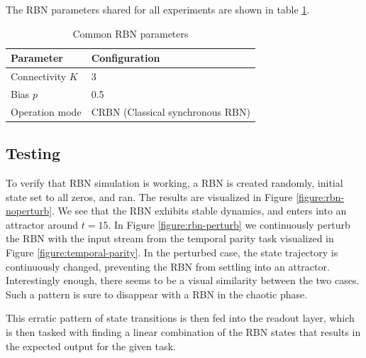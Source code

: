 The RBN parameters shared for all experiments are shown in table
\ref{table:shared-rbn-parameters}.

\begin{table}[h]
    \centering
    \caption{Common RBN parameters}
    \label{table:shared-rbn-parameters}
    \begin{tabular}{ll}
        \hline
        \textbf{Parameter} & \textbf{Configuration} \\
        \hline
        \hline
        Connectivity $K$ & 3   \\
        Bias $p$         & 0.5 \\
        Operation mode & CRBN (Classical synchronous RBN) \\
        \hline
    \end{tabular}
\end{table}

\subsection{Testing}

To verify that RBN simulation is working,
a RBN is created randomly, initial state set to all zeros, and ran.
The results are visualized in Figure \ref{figure:rbn-noperturb}.
We see that the RBN exhibits stable dynamics, and enters into an attractor around $t=15$.
In Figure \ref{figure:rbn-perturb} we continuously perturb the RBN with the input stream from the temporal parity task visualized in Figure \ref{figure:temporal-parity}.
In the perturbed case, the state trajectory is continuously changed, preventing the RBN from settling into an attractor.
Interestingly enough, there seems to be a visual similarity between the two cases.
Such a pattern is sure to disappear with a RBN in the chaotic phase.

This erratic pattern of state transitions is then fed into the readout layer,
which is then tasked with finding a linear combination of the RBN states that results in the expected output for the given task.

